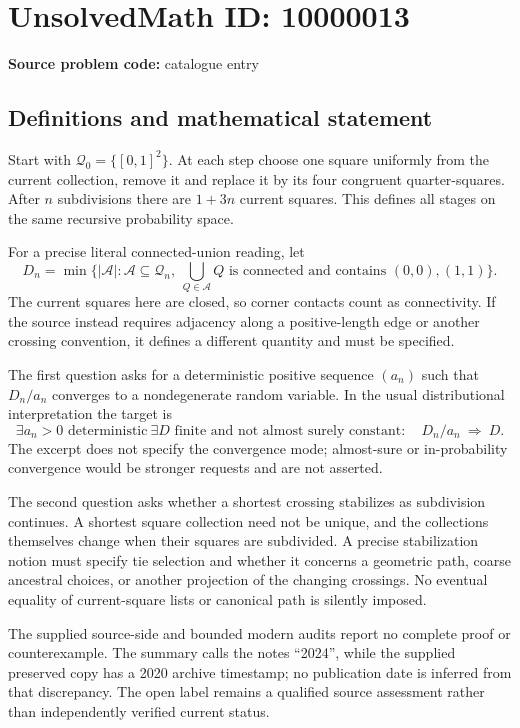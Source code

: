 \documentclass[11pt]{article}
\begin{document}
\section*{UnsolvedMath ID: 10000013}
\textbf{Source problem code:} catalogue entry
\subsection{Definitions and mathematical statement}
Start with \(\mathcal Q_0=\{[0,1]^2\}\). At each step choose one square uniformly from the current collection, remove it and replace it by its four congruent quarter-squares. After \(n\) subdivisions there are \(1+3n\) current squares. This defines all stages on the same recursive probability space.

For a precise literal connected-union reading, let
\[
 D_n=\min\{|\mathcal A|:\mathcal A\subseteq\mathcal Q_n,
 \ \bigcup_{Q\in\mathcal A}Q\text{ is connected and contains }(0,0),(1,1)\}.
\]
The current squares here are closed, so corner contacts count as connectivity. If the source instead requires adjacency along a positive-length edge or another crossing convention, it defines a different quantity and must be specified.

The first question asks for a deterministic positive sequence \((a_n)\) such that \(D_n/a_n\) converges to a nondegenerate random variable. In the usual distributional interpretation the target is
\[
 \exists a_n>0\text{ deterministic}\ \exists D\text{ finite and not almost surely constant}:\quad
 D_n/a_n\ \Longrightarrow\ D.
\]
The excerpt does not specify the convergence mode; almost-sure or in-probability convergence would be stronger requests and are not asserted.

The second question asks whether a shortest crossing stabilizes as subdivision continues. A shortest square collection need not be unique, and the collections themselves change when their squares are subdivided. A precise stabilization notion must specify tie selection and whether it concerns a geometric path, coarse ancestral choices, or another projection of the changing crossings. No eventual equality of current-square lists or canonical path is silently imposed.

The supplied source-side and bounded modern audits report no complete proof or counterexample. The summary calls the notes ``2024'', while the supplied preserved copy has a 2020 archive timestamp; no publication date is inferred from that discrepancy. The open label remains a qualified source assessment rather than independently verified current status.
\end{document}
